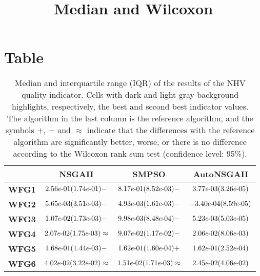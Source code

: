 \documentclass{article}
\title{Median and Wilcoxon}
\author{}
\begin{document}
\maketitle
\section{Table}
\begin{table}[!htp]
  \caption{Median and interquartile range (IQR) of the results of the NHV quality indicator. Cells with dark and light gray background highlights, respectively, the best and second best indicator values. The algorithm in the last column is the reference algorithm, and the symbols $+$, $-$ and $\approx$ indicate that the differences with the reference algorithm are significantly better, worse, or there is no difference according to the Wilcoxon rank sum test (confidence level: 95\%).}
  \label{table:NHV}
  \centering
  \begin{tiny}
  \begin{tabular}{c|ccc}
      & \textbf{NSGAII} & \textbf{SMPSO} & \textbf{AutoNSGAII} \\\hline
\textbf{WFG1} & $\cellcolor{gray25} {2.56e\makebox[0.1cm]{-}01(1.74e\makebox[0.1cm]{-}01)-} $ & $ {8.17e\makebox[0.1cm]{-}01(8.52e\makebox[0.1cm]{-}03)-} $ & $ \cellcolor{gray95} 3.77e\makebox[0.1cm]{-}03(3.26e\makebox[0.1cm]{-}05)$ \\
\textbf{WFG2} & ${5.65e\makebox[0.1cm]{-}03(3.51e\makebox[0.1cm]{-}03)-} $ & $ \cellcolor{gray25} {4.93e\makebox[0.1cm]{-}03(1.61e\makebox[0.1cm]{-}03)-} $ & $ \cellcolor{gray95} -3.40e\makebox[0.1cm]{-}04(8.59e\makebox[0.1cm]{-}05)$ \\
\textbf{WFG3} & ${1.07e\makebox[0.1cm]{-}02(1.73e\makebox[0.1cm]{-}03)-} $ & $ \cellcolor{gray25} {9.98e\makebox[0.1cm]{-}03(8.48e\makebox[0.1cm]{-}04)-} $ & $ \cellcolor{gray95} 5.23e\makebox[0.1cm]{-}03(5.03e\makebox[0.1cm]{-}05)$ \\
\textbf{WFG4} & $\cellcolor{gray25} {2.07e\makebox[0.1cm]{-}02(1.75e\makebox[0.1cm]{-}03)\approx} $ & $ {9.07e\makebox[0.1cm]{-}02(1.17e\makebox[0.1cm]{-}02)-} $ & $ \cellcolor{gray95} 2.06e\makebox[0.1cm]{-}02(8.06e\makebox[0.1cm]{-}03)$ \\
\textbf{WFG5} & ${1.68e\makebox[0.1cm]{-}01(1.44e\makebox[0.1cm]{-}03)-} $ & $ \cellcolor{gray95} {1.62e\makebox[0.1cm]{-}01(1.60e\makebox[0.1cm]{-}04)+} $ & $ \cellcolor{gray25} 1.62e\makebox[0.1cm]{-}01(2.52e\makebox[0.1cm]{-}04)$ \\
\textbf{WFG6} & ${4.02e\makebox[0.1cm]{-}02(3.22e\makebox[0.1cm]{-}02)\approx} $ & $ \cellcolor{gray95} {1.51e\makebox[0.1cm]{-}02(1.71e\makebox[0.1cm]{-}03)\approx} $ & $ \cellcolor{gray25} 2.45e\makebox[0.1cm]{-}02(4.06e\makebox[0.1cm]{-}02)$ \\

\end{tabular}
\end{tiny}
\end{table}
\end{document}
